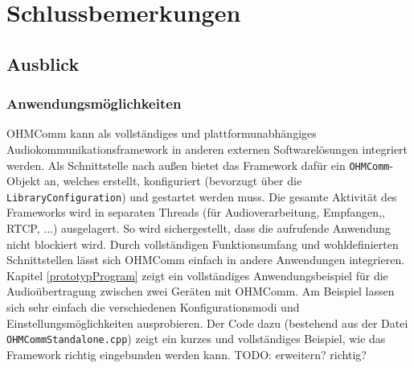 \chapter{Schlussbemerkungen}

\section{Ausblick}

\subsection{Anwendungsmöglichkeiten}
OHMComm kann als vollständiges und plattformunabhängiges Audiokommunikationsframework in anderen externen Softwarelösungen integriert werden. Als Schnittstelle nach außen bietet das Framework dafür ein \texttt{OHMComm}-Objekt an, welches erstellt, konfiguriert (bevorzugt über die \texttt{LibraryConfiguration}) und gestartet werden muss. Die gesamte Aktivität des Frameworks wird in separaten Threads (für Audioverarbeitung, Empfangen,, RTCP, ...) ausgelagert. So wird sichergestellt, dass die aufrufende Anwendung nicht blockiert wird. Durch vollständigen Funktionsumfang und wohldefinierten Schnittstellen lässt sich OHMComm einfach in andere Anwendungen integrieren.
Kapitel \ref{prototypProgram} zeigt ein vollständiges Anwendungsbeispiel für die Audioübertragung zwischen zwei Geräten mit OHMComm. Am Beispiel lassen sich sehr einfach die verschiedenen Konfigurationsmodi und Einstellungsmöglichkeiten ausprobieren. Der Code dazu (bestehend aus der Datei \texttt{OHMCommStandalone.cpp}) zeigt ein kurzes und vollständiges Beispiel, wie das Framework richtig eingebunden werden kann.
TODO: erweitern? richtig?


